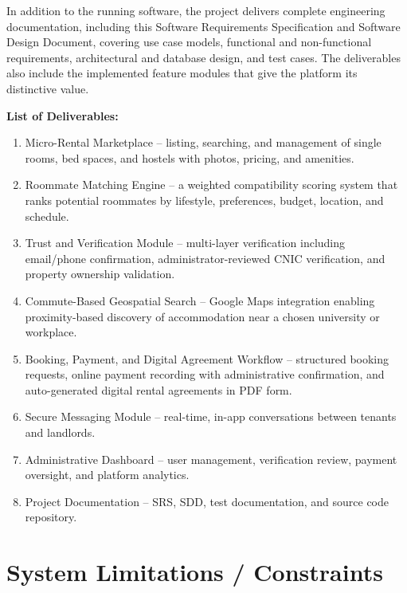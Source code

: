 In addition to the running software, the project delivers complete engineering documentation, including this Software Requirements Specification and Software Design Document, covering use case models, functional and non-functional requirements, architectural and database design, and test cases. The deliverables also include the implemented feature modules that give the platform its distinctive value.

\vspace{0.5cm}

\textbf{List of Deliverables:}

\begin{enumerate}
    \item Micro-Rental Marketplace -- listing, searching, and management of single rooms, bed spaces, and hostels with photos, pricing, and amenities.
    \item Roommate Matching Engine -- a weighted compatibility scoring system that ranks potential roommates by lifestyle, preferences, budget, location, and schedule.
    \item Trust and Verification Module -- multi-layer verification including email/phone confirmation, administrator-reviewed CNIC verification, and property ownership validation.
    \item Commute-Based Geospatial Search -- Google Maps integration enabling proximity-based discovery of accommodation near a chosen university or workplace.
    \item Booking, Payment, and Digital Agreement Workflow -- structured booking requests, online payment recording with administrative confirmation, and auto-generated digital rental agreements in PDF form.
    \item Secure Messaging Module -- real-time, in-app conversations between tenants and landlords.
    \item Administrative Dashboard -- user management, verification review, payment oversight, and platform analytics.
    \item Project Documentation -- SRS, SDD, test documentation, and source code repository.
\end{enumerate}


\section{System Limitations / Constraints}

